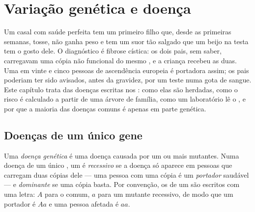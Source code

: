 \chapter{Variação genética e doença}\label{ch:g11:genes-and-disease}

Um casal com saúde perfeita tem um primeiro filho que, desde as
primeiras semanas, tosse, não ganha peso e tem um suor tão salgado que
um beijo na testa tem o gosto dele. O diagnóstico é fibrose cística: os
dois pais, sem saber, carregavam uma cópia não funcional do mesmo ,
e a criança recebeu as duas. Uma em vinte e cinco pessoas de
ascendência europeia é portadora assim; os pais poderiam ter sido
avisados, antes da gravidez, por um teste numa gota de sangue. Este
capítulo trata das doenças escritas nos : como elas são herdadas,
como o risco é calculado a partir de uma árvore de família, como um
laboratório lê o , e por que a maioria das doenças comuns é apenas
em parte genética.

\section{Doenças de um único gene}

\begin{definition}\label{def:g11:genes-and-disease:genetic}
Uma \emph{doença genética} é uma doença causada
por um ou mais  mutantes. Numa doença de um único , um 
é \emph{recessivo} se a doença só aparece em pessoas
que carregam duas cópias dele --- uma pessoa com uma cópia é um
\emph{portador} saudável --- e
\emph{dominante} se uma cópia basta. Por convenção, os
 de um  são escritos com uma letra: $A$ para o  comum,
$a$ para um mutante recessivo, de modo que um portador é $Aa$ e uma
pessoa afetada é $aa$.
\end{definition}

